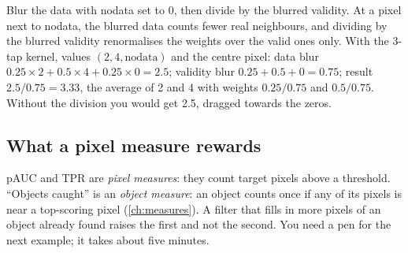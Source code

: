 Blur the data with nodata set to 0, then divide by the blurred validity. At a pixel next to nodata, the blurred data
counts fewer real neighbours, and dividing by the blurred validity renormalises the weights over the valid ones only. With
the 3-tap kernel, values $(2, 4, \text{nodata})$ and the centre pixel: data blur $0.25 \times 2 + 0.5 \times 4 + 0.25
\times 0 = 2.5$; validity blur $0.25 + 0.5 + 0 = 0.75$; result $2.5 / 0.75 = 3.33$, the average of 2 and 4 with weights
$0.25/0.75$ and $0.5/0.75$. Without the division you would get 2.5, dragged towards the zeros.

\subsection{What a pixel measure rewards}\label{sec:scoringgains:pixels}

pAUC and TPR are \emph{pixel measures}: they count target pixels above a threshold. ``Objects caught'' is an \emph{object
measure}: an object counts once if any of its pixels is near a top-scoring pixel (\cref{ch:measures}). A filter that fills
in more pixels of an object already found raises the first and not the second. You need a pen for the next example; it
takes about five minutes.

